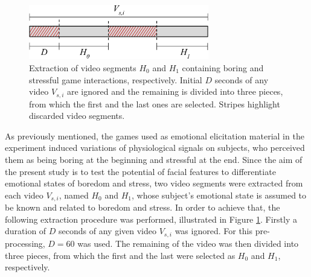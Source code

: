 \begin{figure}
\centering
\includegraphics[width=0.7\textwidth]{Content/figures/pre-processing}
\caption{Extraction of video segments $H_0$ and $H_1$ containing boring and stressful game interactions, respectively. Initial $D$ seconds of any video $V_{s,i}$ are ignored and the remaining is divided into three pieces, from which the first and the last ones are selected. Stripes highlight discarded video segments.}
\label{fig:preprocessing}
\end{figure}

As previously mentioned, the games used as emotional elicitation material in the experiment induced variations of physiological signals on subjects, who perceived them as being boring at the beginning and stressful at the end. Since the aim of the present study is to test the potential of facial features to differentiate emotional states of boredom and stress, two video segments were extracted from each video $V_{s,i}$, named $H_0$ and $H_1$, whose subject's emotional state is assumed to be known and related to boredom and stress. In order to achieve that, the following extraction procedure was performed, illustrated in Figure \ref{fig:preprocessing}. Firstly a duration of $D$ seconds of any given video $V_{s,i}$ was ignored. For this pre-processing, $D=60$ was used. The remaining of the video was then divided into three pieces, from which the first and the last were selected as $H_0$ and $H_1$, respectively.


